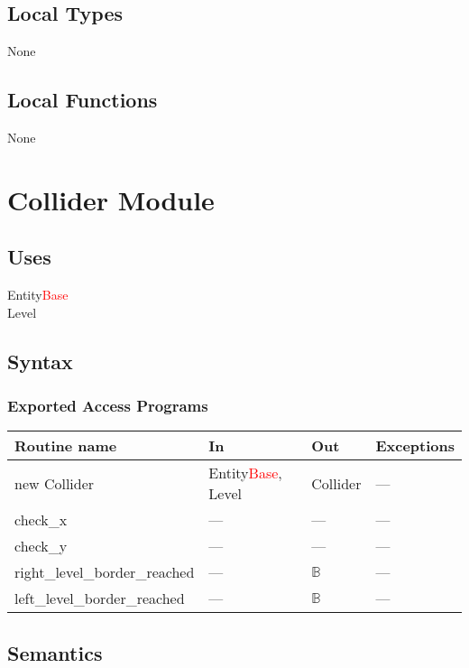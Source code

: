 \documentclass[12pt]{article}
\begin{document}
\subsection* {Local Types}

None

\subsection* {Local Functions}

None

\newpage

\section* {Collider Module}

\subsection* {Uses}
Entity\textcolor{red}{Base}\\
Level
\subsection* {Syntax}

\subsubsection* {Exported Access Programs}

\begin{tabular}{| l | l | l | l |}
\hline
\textbf{Routine name} & \textbf{In} & \textbf{Out} & \textbf{Exceptions}\\
\hline
new Collider & Entity\textcolor{red}{Base}, Level & Collider & ---\\
\hline
check\_x & --- & --- & ---\\
\hline
check\_y & --- & --- & ---\\
\hline
right\_level\_border\_reached & --- & $\mathbb{B}$ & ---\\
\hline
left\_level\_border\_reached & --- & $\mathbb{B}$ & ---\\
\hline
\end{tabular}

\subsection* {Semantics}
\end{document}
